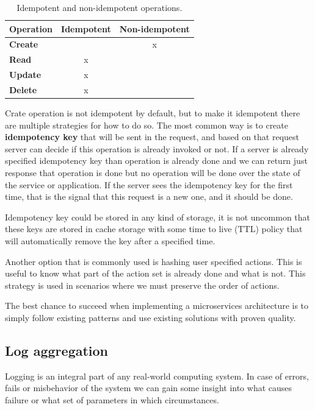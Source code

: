 \begin{table}[h!]
	\begin{center}
		\begin{tabular}{l|c|c}
			\textbf{Operation} & \textbf{Idempotent} & \textbf{Non-idempotent}\\
			\hline
			\textbf{Create} &  & x \\
			\textbf{Read} & x & \\
			\textbf{Update} & x & \\
			\textbf{Delete} & x & \\
		\end{tabular}
	\end{center}
	\vspace{-0.5cm}
	\caption{Idempotent and non-idempotent operations.}
	\label{tab:table8}
\end{table}

\noindent
Crate operation is not idempotent by default, but to make it idempotent there are multiple strategies for how to do so. The most common way is to create \textbf{idempotency key} that will be sent in the request, and based on that request server can decide if this operation is already invoked or not. If a server is already  specified idempotency key than operation is already done and we can return just response that operation is done but no operation will be done over the state of the service or application. If the server sees the idempotency key for the first time, that is the signal that this request is a new one, and it should be done.

Idempotency key could be stored in any kind of storage, it is not uncommon that these keys are stored in cache storage with some time to live (TTL) policy that will automatically remove the key after a specified time.

Another option that is commonly used is hashing user specified actions. This is useful to know what part of the action set is already done and what is not. This strategy is used in scenarios where we must preserve the order of actions.

The best chance to succeed when implementing a microservices architecture is to simply follow existing patterns and use existing solutions with proven quality.
%
%
\subsection{Log aggregation}\label{sec:log_aggregation}
%
Logging is an integral part of any real-world computing system. In case of errors, fails or misbehavior of the system we can gain some insight into what causes failure or what set of parameters in which circumstances.

